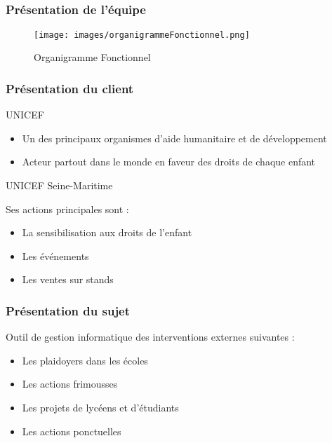 \subsection{} %

\begin{frame}
\frametitle{Présentation de l'équipe}
	\begin{figure}
		\texttt{[image: images/organigrammeFonctionnel.png]}
		\caption{Organigramme Fonctionnel}
		\label{OF}
	\end{figure}
\end{frame}

\begin{frame}
\frametitle{Présentation du client}
	\begin{center}
		UNICEF
	\end{center}
	\begin{itemize}
		\item Un des principaux organismes d’aide humanitaire et de développement
		\item Acteur partout dans le monde en faveur des droits de chaque enfant
	\end{itemize}
	
	\begin{center}
		UNICEF Seine-Maritime
	\end{center}
	Ses actions principales sont : 
	\begin{itemize}
		\item La sensibilisation aux droits de l'enfant
		\item Les événements 
		\item Les ventes sur stands
	\end{itemize}
	
\end{frame}
\begin{frame}
\frametitle{Présentation du sujet}
Outil de gestion informatique des interventions externes suivantes :

	\begin{itemize}
		\item Les plaidoyers dans les \'ecoles
		\item Les actions frimousses
		\item Les projets de lycéens et d'étudiants
		\item Les actions ponctuelles
	\end{itemize}
	
\end{frame}